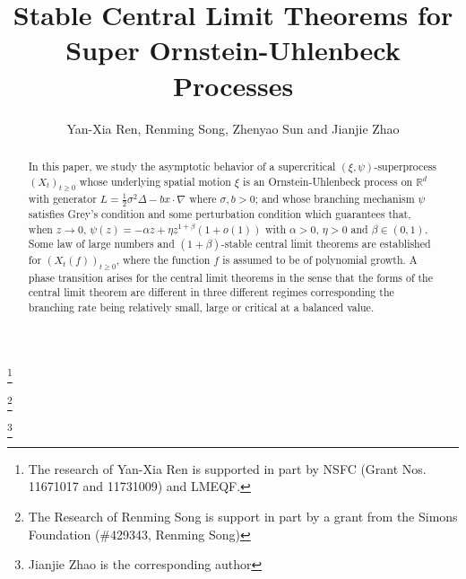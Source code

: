 \documentclass[12pt,a4paper]{amsart}
\theoremstyle{plain}
\theoremstyle{definition}
\numberwithin{equation}{section}
\begin{document}
\title
[stable CLT for super-OU processes]
{Stable Central Limit Theorems for Super Ornstein-Uhlenbeck Processes}
\author
[Y.-X. Ren, R. Song, Z. Sun and J. Zhao]
{Yan-Xia Ren, Renming Song, Zhenyao Sun and Jianjie Zhao}
\address{
  Yan-Xia Ren \\
  LMAM School of Mathematical Sciences \& Center for Statistical Science \\
  Peking University \\
  Beijing, P. R. China, 100871}
\thanks{The research of Yan-Xia Ren is supported in part by NSFC (Grant Nos. 11671017  and 11731009) and LMEQF.}
\address{
  Renming Song \\
  Department of Mathematics \\
  University of Illinois at Urbana-Champaign \\
  Urbana, IL, USA, 61801}
\thanks{The Research of Renming Song is support in part by a grant from the Simons Foundation (\#429343, Renming Song)}
\address{
  Zhenyao Sun \\
  School of Mathematics and Statistics\\
  Wuhan University \\
  Hubei, P. R. China, 100871}
\address{
  Jianjie Zhao \\
  School of Mathematical Sciences \\
  Peking University \\
  Beijing, P. R. China, 100871}
\thanks{Jianjie Zhao is the corresponding author}
\begin{abstract}
  In this paper, we study the asymptotic behavior of a supercritical $(\xi,\psi)$-superprocess $(X_t)_{t\geq 0}$
  whose underlying spatial motion $\xi$ is an Ornstein-Uhlenbeck process on $\mathbb R^d$ with generator $L = \frac{1}{2}\sigma^2\Delta - b x \cdot \nabla$ where $\sigma, b >0$;
  and whose branching mechanism $\psi$ satisfies Grey's condition and some perturbation condition which guarantees that,
 when $z\to 0$, $\psi(z)=-\alpha z + \eta z^{1+\beta} (1+o(1))$ with $\alpha > 0$, $\eta>0$ and $\beta\in (0, 1)$.
  Some law of large numbers and $(1+\beta)$-stable central limit theorems are established for
  $(X_t(f) )_{t\geq 0}$, where the function $f$ is
  assumed to be of polynomial growth.
A phase transition arises  for the central limit theorems in the sense 
that the forms of the central limit theorem are different in three different regimes corresponding the branching rate 
being relatively small, large or critical at a balanced value.
\end{abstract}
\maketitle
\end{document}
